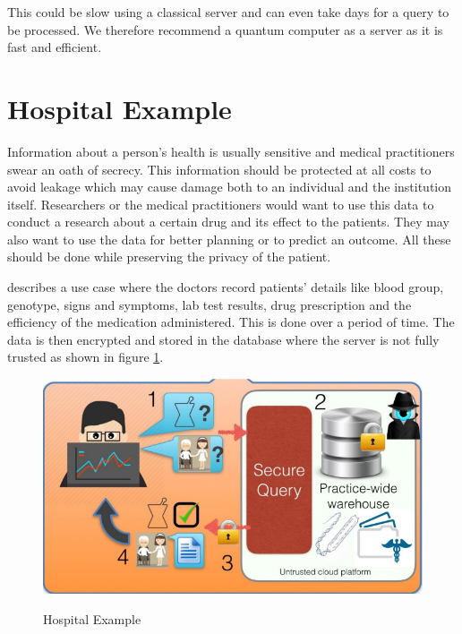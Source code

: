 This could be slow using a classical server and can even take days for a query to be processed. We therefore recommend a quantum computer as a server as it is fast and efficient. 


\section{Hospital Example}
Information about a person's health is usually sensitive and medical practitioners swear an oath of secrecy. This information should be protected at all costs to avoid leakage which may cause damage both to an individual and the institution itself. Researchers or the medical practitioners would want to use this data to conduct a research about a certain drug and its effect to the patients. They may also want to use the data for better planning or to predict an outcome. All these should be done while preserving the privacy of the patient.

\citet{archerapplications} describes a use case where the doctors record patients' details like blood group, genotype, signs and symptoms, lab test results, drug prescription and the efficiency of the medication administered. This is done over a period of time. The data is then encrypted and stored in the database where the server is not fully trusted as shown in figure \ref{fig1: Hosptial Example}. 
\begin{figure}[!h]
\center
\includegraphics[scale=0.5]{images/hos.png} 
\caption{Hospital Example }
\label{fig1: Hosptial Example}
\citep{archerapplications}
\end{figure}


